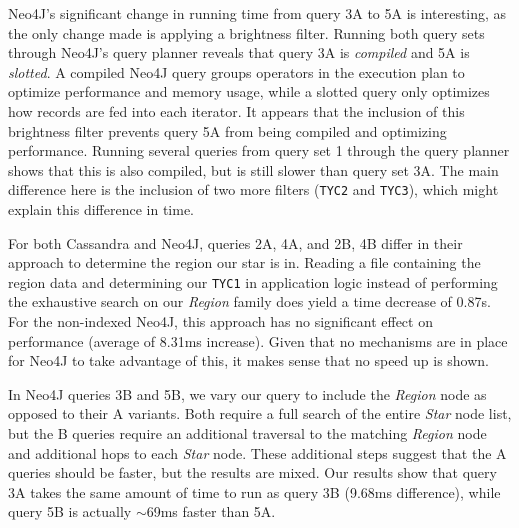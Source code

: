 Neo4J's significant change in running time from query 3A to 5A is interesting, as the only change made is
applying a brightness filter.
Running both query sets through Neo4J's query planner reveals that query 3A is \textit{compiled} and 5A is
\textit{slotted}.
A compiled Neo4J query groups operators in the execution plan to optimize performance and memory usage, while a
slotted query only optimizes how records are fed into each iterator.
It appears that the inclusion of this brightness filter prevents query 5A from being compiled and optimizing
performance.
Running several queries from query set 1 through the query planner shows that this is also compiled, but is still
slower than query set 3A\@.
The main difference here is the inclusion of two more filters (\texttt{TYC2} and \texttt{TYC3}), which might explain
this difference in time.

For both Cassandra and Neo4J, queries 2A, 4A, and 2B, 4B differ in their approach to determine the region our star is
in.
Reading a file containing the region data and determining our \texttt{TYC1} in application logic instead of
performing the exhaustive search on our \textit{Region} family does yield a time decrease of 0.87s.
For the non-indexed Neo4J, this approach has no significant effect on performance (average of 8.31ms increase).
Given that no mechanisms are in place for Neo4J to take advantage of this, it makes sense that no speed up is shown.

In Neo4J queries 3B and 5B, we vary our query to include the \textit{Region} node as opposed to their A variants.
Both require a full search of the entire \textit{Star} node list, but the B queries require an additional traversal
to the matching \textit{Region} node and additional hops to each \textit{Star} node.
These additional steps suggest that the A queries should be faster, but the results are mixed.
Our results show that query 3A takes the same amount of time to run as query 3B (9.68ms difference), while query 5B
is actually $\sim$69ms faster than 5A\@.


